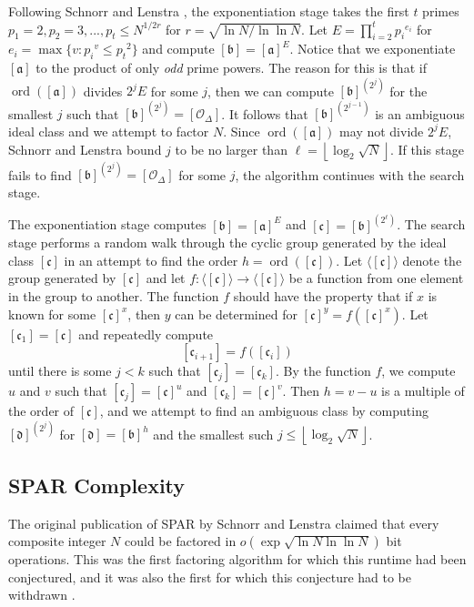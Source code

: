 \documentclass{ucalgthes1}
\theoremstyle{definition}
\DeclareMathOperator{\ord}{ord}
\newcommand{\floor}[1]{\left\lfloor #1 \right\rfloor}
\newcommand{\ideal}{\mathfrak}
\newcommand{\idealclass}[1]{\left[ \ideal #1 \right]}
\newcommand{\aclass}{\idealclass a}
\newcommand{\bclass}{\idealclass b}
\newcommand{\cclass}{\idealclass c}
\newcommand{\dclass}{\idealclass d}
\newcommand{\idclass}{[\mathcal O_\Delta]}
\begin{document}
Following Schnorr and Lenstra \cite{Schnorr1984}, the exponentiation stage takes the first $t$ primes $p_1 = 2, p_2 = 3, ..., p_t \le N^{1/2r}$ for $r = \sqrt{\ln N / \ln \ln N}$.  Let $E = \prod_{i=2}^t {p_i}^{e_i}$ for $e_i = \max \{ v : {p_i}^v \le {p_t}^2 \}$ and compute $\bclass = \aclass^E$.  Notice that we exponentiate $\aclass$ to the product of only \emph{odd} prime powers.  The reason for this is that if $\ord(\aclass)$ divides $2^j E$ for some $j$, then we can compute $\bclass^{\left(2^j\right)}$ for the smallest $j$ such that $\bclass^{\left(2^j\right)} = \idclass$.  It follows that $\bclass^{\left(2^{j-1}\right)}$ is an ambiguous ideal class and we attempt to factor $N$.  Since $\ord(\aclass)$ may not divide $2^jE$, Schnorr and Lenstra \cite[p.291]{Schnorr1984} bound $j$ to be no larger than $\ell = \floor{\log_2{\sqrt N}}$.  If this stage fails to find $\bclass^{\left(2^j\right)} = \idclass$ for some $j$, the algorithm continues with the search stage.

The exponentiation stage computes $\bclass = \aclass^E$ and $\cclass = \bclass^{\left(2^\ell\right)}$.  The search stage performs a random walk through the cyclic group generated by the ideal class $\cclass$ in an attempt to find the order $h = \ord(\cclass)$.  Let $\langle \cclass \rangle$ denote the group generated by $\cclass$ and let $f : \langle \cclass \rangle \rightarrow \langle \cclass \rangle$ be a function from one element in the group to another.  The function $f$ should have the property that if $x$ is known for some $\cclass ^x$, then $y$ can be determined for $\cclass^y = f(\cclass^x)$.  Let $[\mathfrak c_1] = \cclass$ and repeatedly compute
\[
	[\mathfrak c_{i+1}] = f([\mathfrak c_i])
\]
until there is some $j < k$ such that $[\mathfrak c_j] = [\mathfrak c_k]$.  By the function $f$, we compute $u$ and $v$ such that $[\mathfrak c_j]=\cclass^u$ and $[\mathfrak c_k]=\cclass^v$.  Then $h = v - u$ is a multiple of the order of $\cclass$, and we attempt to find an ambiguous class by computing $\dclass^{\left(2^j\right)}$ for $\dclass = \bclass^h$ and the smallest such $j \le \floor{\log_2{\sqrt N}}$.

\subsection{SPAR Complexity}


The original publication of SPAR by Schnorr and Lenstra \cite{Schnorr1984} claimed that every composite integer $N$ could be factored in $o\left(\exp\sqrt{\ln N \ln\ln N}\right)$ bit operations.  This was the first factoring algorithm for which this runtime had been conjectured, and it was also the first for which this conjecture had to be withdrawn \cite{Lenstra1992}.
\end{document}

